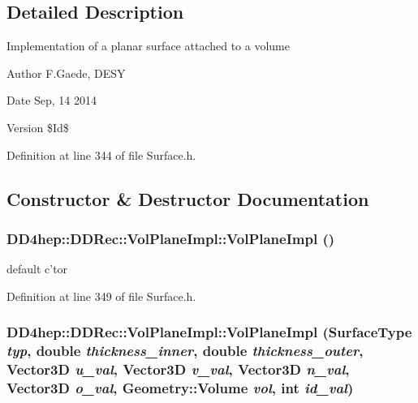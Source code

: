 \subsection{Detailed Description}
Implementation of a planar surface attached to a volume \begin{DoxyAuthor}{Author}
F.Gaede, DESY 
\end{DoxyAuthor}
\begin{DoxyDate}{Date}
Sep, 14 2014 
\end{DoxyDate}
\begin{DoxyVersion}{Version}
\$Id\$ 
\end{DoxyVersion}


Definition at line 344 of file Surface.h.

\subsection{Constructor \& Destructor Documentation}
\hypertarget{class_d_d4hep_1_1_d_d_rec_1_1_vol_plane_impl_a37e60d5d920d384a03463e2870293306}{
\subsubsection[{VolPlaneImpl}]{\setlength{\rightskip}{0pt plus 5cm}DD4hep::DDRec::VolPlaneImpl::VolPlaneImpl ()}}
\label{class_d_d4hep_1_1_d_d_rec_1_1_vol_plane_impl_a37e60d5d920d384a03463e2870293306}


default c'tor 

Definition at line 349 of file Surface.h.\hypertarget{class_d_d4hep_1_1_d_d_rec_1_1_vol_plane_impl_adf4bdd2cb9f2f01e7662f6b0a1cb1379}{
\subsubsection[{VolPlaneImpl}]{\setlength{\rightskip}{0pt plus 5cm}DD4hep::DDRec::VolPlaneImpl::VolPlaneImpl ({\bf SurfaceType} {\em typ}, \/  double {\em thickness\_\-inner}, \/  double {\em thickness\_\-outer}, \/  {\bf Vector3D} {\em u\_\-val}, \/  {\bf Vector3D} {\em v\_\-val}, \/  {\bf Vector3D} {\em n\_\-val}, \/  {\bf Vector3D} {\em o\_\-val}, \/  {\bf Geometry::Volume} {\em vol}, \/  int {\em id\_\-val})}}
\label{class_d_d4hep_1_1_d_d_rec_1_1_vol_plane_impl_adf4bdd2cb9f2f01e7662f6b0a1cb1379}


